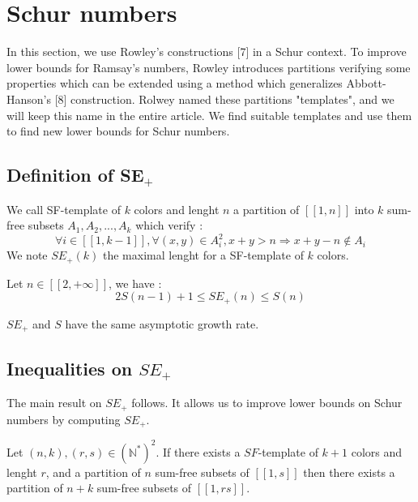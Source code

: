 \section{Schur numbers}

\qquad In this section, we use Rowley's constructions [7] in a Schur context. To improve lower bounds for Ramsay's numbers, Rowley 
introduces partitions verifying some properties which can be extended using a method which generalizes Abbott-Hanson's [8] construction. 
Rolwey named these partitions "templates", and we will keep this name in the entire article. We find suitable templates and use them
 to find new lower bounds for Schur numbers.

\subsection{Definition of SE\(_+\)}

\begin{definition}
	We call SF-template of \(k\) colors and lenght \(n\) a partition of \( [\![1,n]\!]\) into \(k\) sum-free subsets \(A_1, A_2, ..., A_k\) which verify :
	\[
	\forall i \in [\![1, k-1]\!], \forall (x,y) \in A_i^2, x+y > n
	\Longrightarrow x+y-n \notin A_i
	\]
	We note \(SE_+(k)\) the maximal lenght for a SF-template of \(k\) colors. 
\end{definition}

\begin{theorem}
	Let \(n \in [\![2, +\infty]\!]\), we have :
	\[
	2S(n-1)+1 \leqslant SE_+(n) \leqslant S(n)
	\]
\end{theorem}

\begin{remark}
	\(SE_+\) and \(S\) have the same asymptotic growth rate.
\end{remark}


\subsection{Inequalities on \(SE_+\)} 

The main result on \(SE_+\) follows. It allows us to improve lower bounds on Schur numbers by computing \(SE_+\).

\begin{theorem}
	Let $(n,k), (r,s) \in (\mathbb{N}^*)^2$. If there exists a \(SF\)-template of $k+1$ colors and lenght \(r\),
	and a partition of $n$ sum-free subsets of $[\![1,s]\!]$ then there exists a partition of $n+k$ sum-free subsets of $[\![1,rs]\!]$.
\end{theorem}


